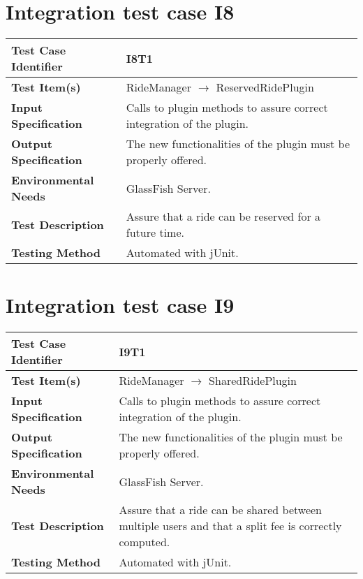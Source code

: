 \vspace{2em}

\section{Integration test case I8}

\begin{tabular}{l p{}}
    \hline
    \textbf{Test Case Identifier} & I8T1\\
    \hline
    \textbf{Test Item(s)} & RideManager $\rightarrow$ ReservedRidePlugin\\
    \hline
    \textbf{Input Specification} & Calls to plugin methods to assure correct integration of the plugin.\\
    \hline
    \textbf{Output Specification} & The new functionalities of the plugin must be properly offered.\\
    \hline
    \textbf{Environmental Needs} & GlassFish Server.\\
    \hline
    \textbf{Test Description} & Assure that a ride can be reserved for a future time.\\
    \hline
    \textbf{Testing Method} & Automated with jUnit. \\
    \hline
\end{tabular}

\vspace{2em}

\section{Integration test case I9}

\begin{tabular}{l p{}}
    \hline
    \textbf{Test Case Identifier} & I9T1\\
    \hline
    \textbf{Test Item(s)} & RideManager $\rightarrow$ SharedRidePlugin\\
    \hline
    \textbf{Input Specification} & Calls to plugin methods to assure correct integration of the plugin.\\
    \hline
    \textbf{Output Specification} & The new functionalities of the plugin must be properly offered.\\
    \hline
    \textbf{Environmental Needs} & GlassFish Server.\\
    \hline
    \textbf{Test Description} & Assure that a ride can be shared between multiple users and that a split fee is correctly computed.\\
    \hline
    \textbf{Testing Method} & Automated with jUnit.\\
    \hline
\end{tabular}

